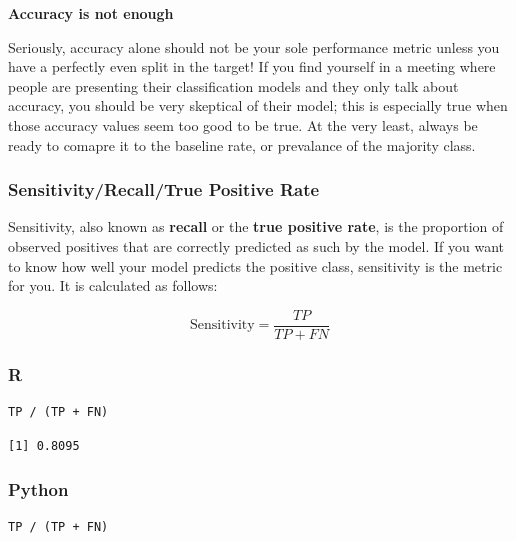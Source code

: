 \documentclass[
  letterpaper,
]{krantz}
\begin{document}
\begin{tcolorbox}[enhanced jigsaw, colframe=quarto-callout-warning-color-frame, opacityback=0, breakable, left=2mm, rightrule=.15mm, toprule=.15mm, arc=.35mm, leftrule=.75mm, colback=white, bottomrule=.15mm]

\vspace{-3mm}\textbf{Accuracy is not enough}\vspace{3mm}

Seriously, accuracy alone should not be your sole performance metric
unless you have a perfectly even split in the target! If you find
yourself in a meeting where people are presenting their classification
models and they only talk about accuracy, you should be very skeptical
of their model; this is especially true when those accuracy values seem
too good to be true. At the very least, always be ready to comapre it to
the baseline rate, or prevalance of the majority class.

\end{tcolorbox}

\subsubsection{Sensitivity/Recall/True Positive
Rate}\label{sec-knowing-metrics-sensitivity}

Sensitivity, also known as \textbf{recall} or the \textbf{true positive
rate}, is the proportion of observed positives that are correctly
predicted as such by the model. If you want to know how well your model
predicts the positive class, sensitivity is the metric for you. It is
calculated as follows:

\[\text{Sensitivity} = \frac{TP}{TP + FN}\]

\subsubsection{R}

\begin{verbatim}
TP / (TP + FN)
\end{verbatim}

\begin{verbatim}
[1] 0.8095
\end{verbatim}

\subsubsection{Python}

\begin{verbatim}
TP / (TP + FN)
\end{verbatim}
\end{document}
